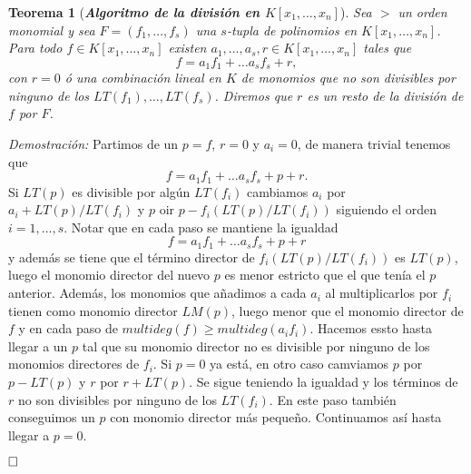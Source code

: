 \documentclass[12pt]{article}
\newtheorem{theorem}{Teorema}[section]
\begin{document}
\begin{theorem}[\textbf{\textit{Algoritmo de la división en $K[x_1, \ldots, x_n]$}}]
Sea $>$ un orden monomial y sea $F=(f_1, \ldots, f_s)$ una $s$-tupla de polinomios en $K[x_1, \ldots, x_n]$. Para todo $f \in K[x_1, \ldots, x_n]$ existen $a_1, \ldots, a_s, r \in K[x_1, \ldots, x_n]$ tales que $$f = a_1f_1 + \ldots a_sf_s + r, $$ con $r=0$ ó una combinación lineal en $K$ de monomios que no son divisibles por ninguno de los $LT(f_1), \ldots, LT(f_s)$. Diremos que $r$ es un resto de la división de $f$ por $F$.
\end{theorem}
\emph{Demostración: }Partimos de un $p=f$, $r=0$ y $a_i =0$, de manera trivial tenemos que $$f = a_1f_1+ \ldots a_sf_s + p + r.$$ Si $LT(p)$ es divisible por algún $LT(f_i)$ cambiamos $a_i$ por $a_i + LT(p)/LT(f_i)$ y $p$ oir $p-f_i(LT(p)/LT(f_i))$ siguiendo el orden $i=1, \ldots, s$. Notar que en cada paso se mantiene la igualdad $$f = a_1f_1+ \ldots a_sf_s + p + r$$ y además se tiene que el término director de $f_i(LT(p)/LT(f_i))$ es $LT(p)$, luego el monomio director del nuevo $p$ es menor estricto que el que tenía el $p$ anterior. Además, los monomios que añadimos a cada $a_i$ al multiplicarlos por $f_i$ tienen como monomio director $LM(p)$, luego menor que el monomio director de $f$ y en cada paso de $multideg(f) \geq multideg(a_if_i)$. Hacemos essto hasta llegar a un $p$ tal que su monomio director no es divisible por ninguno de los monomios directores de $f_i$. Si $p=0$ ya está, en otro caso camviamos $p$ por $p-LT(p)$ y $r$ por $r+LT(p)$. Se sigue teniendo la igualdad y los términos de $r$ no son divisibles por ninguno de los $LT(f_i)$. En este paso también conseguimos un $p$ con monomio director más pequeño. Continuamos así hasta llegar a $p=0$.

$\hfill \square$
\end{document}
